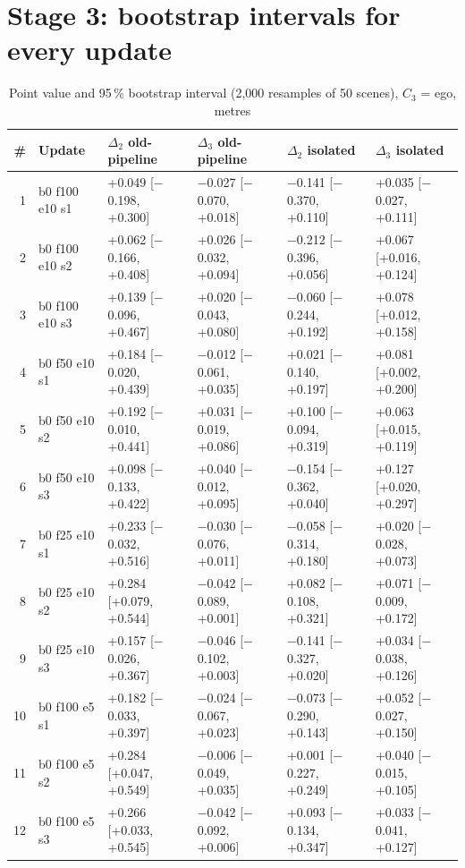 \documentclass[10pt,a4paper]{article}
\newcommand{\Y}{\cellcolor{red!15}}
\begin{document}
\section{Stage 3: bootstrap intervals for every update}
\begin{table}[h]\centering\scriptsize\caption{Point value and 95\,\% bootstrap interval (2{,}000 resamples of 50 scenes), $C_3$ = ego, metres}
\begin{tabular}{rlllll}\toprule
\# & Update & $\Delta_2$ old-pipeline & $\Delta_3$ old-pipeline & $\Delta_2$ isolated & $\Delta_3$ isolated\\\midrule
1 & b0 f100 e10 s1 & +0.049 [$-$0.198, +0.300] & $-$0.027 [$-$0.070, +0.018] & $-$0.141 [$-$0.370, +0.110] & +0.035 [$-$0.027, +0.111]\\
2 & b0 f100 e10 s2 & +0.062 [$-$0.166, +0.408] & +0.026 [$-$0.032, +0.094] & $-$0.212 [$-$0.396, +0.056] & \Y +0.067 [+0.016, +0.124]\\
3 & b0 f100 e10 s3 & +0.139 [$-$0.096, +0.467] & +0.020 [$-$0.043, +0.080] & $-$0.060 [$-$0.244, +0.192] & \Y +0.078 [+0.012, +0.158]\\
4 & b0 f50 e10 s1 & +0.184 [$-$0.020, +0.439] & $-$0.012 [$-$0.061, +0.035] & +0.021 [$-$0.140, +0.197] & \Y +0.081 [+0.002, +0.200]\\
5 & b0 f50 e10 s2 & +0.192 [$-$0.010, +0.441] & +0.031 [$-$0.019, +0.086] & +0.100 [$-$0.094, +0.319] & \Y +0.063 [+0.015, +0.119]\\
6 & b0 f50 e10 s3 & +0.098 [$-$0.133, +0.422] & +0.040 [$-$0.012, +0.095] & $-$0.154 [$-$0.362, +0.040] & \Y +0.127 [+0.020, +0.297]\\
7 & b0 f25 e10 s1 & +0.233 [$-$0.032, +0.516] & $-$0.030 [$-$0.076, +0.011] & $-$0.058 [$-$0.314, +0.180] & +0.020 [$-$0.028, +0.073]\\
8 & b0 f25 e10 s2 & \Y +0.284 [+0.079, +0.544] & $-$0.042 [$-$0.089, +0.001] & +0.082 [$-$0.108, +0.321] & +0.071 [$-$0.009, +0.172]\\
9 & b0 f25 e10 s3 & +0.157 [$-$0.026, +0.367] & $-$0.046 [$-$0.102, +0.003] & $-$0.141 [$-$0.327, +0.020] & +0.034 [$-$0.038, +0.126]\\
10 & b0 f100 e5 s1 & +0.182 [$-$0.033, +0.397] & $-$0.024 [$-$0.067, +0.023] & $-$0.073 [$-$0.290, +0.143] & +0.052 [$-$0.027, +0.150]\\
11 & b0 f100 e5 s2 & \Y +0.284 [+0.047, +0.549] & $-$0.006 [$-$0.049, +0.035] & +0.001 [$-$0.227, +0.249] & +0.040 [$-$0.015, +0.105]\\
12 & b0 f100 e5 s3 & \Y +0.266 [+0.033, +0.545] & $-$0.042 [$-$0.092, +0.006] & +0.093 [$-$0.134, +0.347] & +0.033 [$-$0.041, +0.127]\\

\end{tabular}
\end{table}
\end{document}
